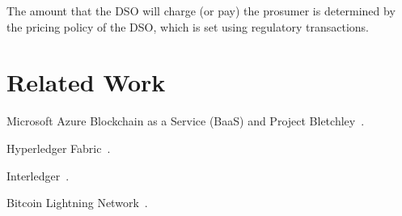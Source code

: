 \documentclass[sigconf]{acmart}
\begin{document}
The amount that the DSO will charge (or pay) the prosumer is determined by the pricing policy of the DSO, which is set using regulatory transactions.


\section{Related Work}

Microsoft Azure Blockchain as a Service (BaaS) and Project Bletchley~\cite{gray2016introducing}.

Hyperledger Fabric~\cite{hyperledger2017fabric}.

Interledger~\cite{thomas_protocol}.

Bitcoin Lightning Network~\cite{poon2016bitcoin}.




\end{document}
